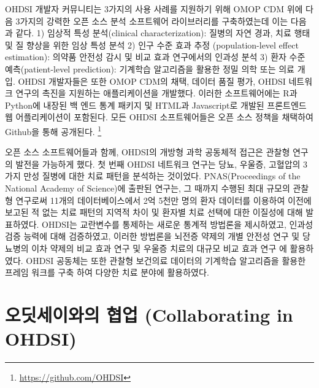 \documentclass[11pt]{book}
\let\rmarkdownfootnote\footnote%
\def\footnote{\protect\rmarkdownfootnote}
\theoremstyle{definition}
\theoremstyle{definition}
\theoremstyle{definition}
\theoremstyle{remark}
\begin{document}
OHDSI 개발자 커뮤니티는 3가지의 사용 사례를 지원하기 위해 OMOP CDM 위에
다음 3가지의 강력한 오픈 소스 분석 소프트웨어 라이브러리를 구축하였는데
이는 다음과 같다. 1) 임상적 특성 분석(clinical characterization): 질병의
자연 경과, 치료 행태 및 질 향상을 위한 임상 특성 분석 2) 인구 수준 효과
추정 (population-level effect estimation): 의약품 안전성 감시 및 비교
효과 연구에서의 인과성 분석 3) 환자 수준 예측(patient-level prediction):
기계학습 알고리즘을 활용한 정밀 의학 또는 의료 개입. OHDSI 개발자들은
또한 OMOP CDM의 채택, 데이터 품질 평가, OHDSI 네트워크 연구의 촉진을
지원하는 애플리케이션을 개발했다. 이러한 소프트웨어에는 R과 Python에
내장된 백 엔드 통계 패키지 및 HTML과 Javascript로 개발된 프론트엔드 웹
어플리케이션이 포함된다. 모든 OHDSI 소프트웨어들은 오픈 소스 정책을
채택하여 Github을 통해 공개된다. \footnote{\url{https://github.com/OHDSI}}

오픈 소스 소프트웨어들과 함께, OHDSI의 개방형 과학 공동체적 접근은
관찰형 연구의 발전을 가능하게 했다. 첫 번째 OHDSI 네트워크 연구는 당뇨,
우울증, 고혈압의 3가지 만성 질병에 대한 치료 패턴을 분석하는 것이었다.
PNAS(Proceedings of the National Academy of Science)에 출판된 연구는, 그
때까지 수행된 최대 규모의 관찰형 연구로써 11개의 데이터베이스에서 2억
5천만 명의 환자 데이터를 이용하여 이전에 보고된 적 없는 치료 패턴의
지역적 차이 및 환자별 치료 선택에 대한 이질성에 대해 발표하였다.
\citep{Hripcsak7329} OHDSI는 교란변수를 통제하는 새로운 통계적 방법론을
제시하였고, \citep{tian_2018} 인과성 검증 능력에 대해 검증하였고,
\citep{schuemie_2018} 이러한 방법론을 뇌전증 약제의 개별 안전성 연구
\citep{duke_2017} 및 당뇨병의 이차 약제의 비교 효과 연구
\citep{vashisht_2018} 및 우울증 치료의 대규모 비교 효과 연구
\citep{schuemie_2018b} 에 활용하였다. OHDSI 공동체는 또한 관찰형
보건의료 데이터의 기계학습 알고리즘을 활용한 프레임 워크를 구축
\citep{reps2018} 하여 다양한 치료 분야에 활용하였다.
\citep{johnston_2019, cepeda_2018, reps_2019}

\section{오딧세이와의 협업 (Collaborating in
OHDSI)}\label{--collaborating-in-ohdsi}
\end{document}
